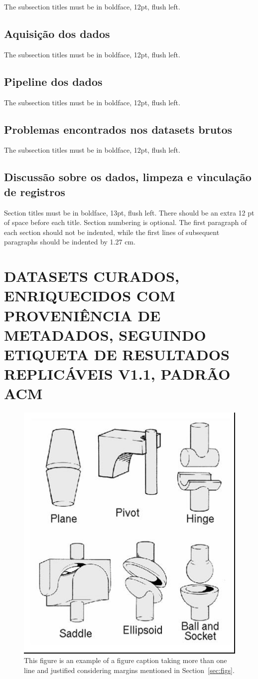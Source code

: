 \documentclass[12pt]{article}
\begin{document}
The subsection titles must be in boldface, 12pt, flush left.

\subsection{Aquisição dos dados}

The subsection titles must be in boldface, 12pt, flush left.

\subsection{Pipeline dos dados}

The subsection titles must be in boldface, 12pt, flush left.

\subsection{Problemas encontrados nos datasets brutos}

The subsection titles must be in boldface, 12pt, flush left.

\subsection{Discussão sobre os dados, limpeza e vinculação de registros}

Section titles must be in boldface, 13pt, flush left. There should be an extra
12 pt of space before each title. Section numbering is optional. The first
paragraph of each section should not be indented, while the first lines of
subsequent paragraphs should be indented by 1.27 cm.

\section{DATASETS CURADOS, ENRIQUECIDOS COM PROVENIÊNCIA DE METADADOS, SEGUINDO ETIQUETA DE RESULTADOS REPLICÁVEIS V1.1, PADRÃO ACM}\label{sec:datasetscurados}

\begin{figure}[ht]
\centering
\includegraphics[width=.3\textwidth]{fig2.jpg}
\caption{This figure is an example of a figure caption taking more than one
  line and justified considering margins mentioned in Section~\ref{sec:figs}.}
\label{fig:exampleFig2}
\end{figure}
\end{document}
